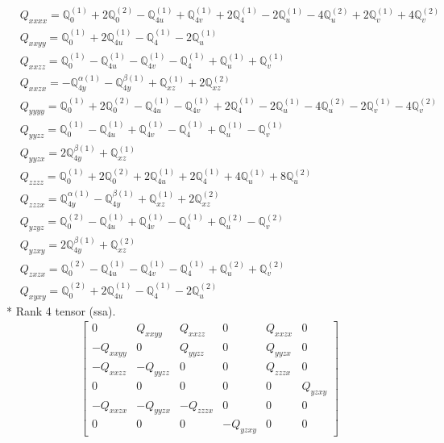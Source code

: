 \documentclass[fleqn,8pt,landscape]{jsarticle}
\begin{document}
\begin{align*}
& Q_{xxxx} = \mathbb{Q}_{0}^{(1)} + 2 \mathbb{Q}_{0}^{(2)} - \mathbb{Q}_{4u}^{(1)} + \mathbb{Q}_{4v}^{(1)} + 2 \mathbb{Q}_{4}^{(1)} - 2 \mathbb{Q}_{u}^{(1)} - 4 \mathbb{Q}_{u}^{(2)} + 2 \mathbb{Q}_{v}^{(1)} + 4 \mathbb{Q}_{v}^{(2)} \\
& Q_{xxyy} = \mathbb{Q}_{0}^{(1)} + 2 \mathbb{Q}_{4u}^{(1)} - \mathbb{Q}_{4}^{(1)} - 2 \mathbb{Q}_{u}^{(1)} \\
& Q_{xxzz} = \mathbb{Q}_{0}^{(1)} - \mathbb{Q}_{4u}^{(1)} - \mathbb{Q}_{4v}^{(1)} - \mathbb{Q}_{4}^{(1)} + \mathbb{Q}_{u}^{(1)} + \mathbb{Q}_{v}^{(1)} \\
& Q_{xxzx} = - \mathbb{Q}_{4y}^{\alpha(1)} - \mathbb{Q}_{4y}^{\beta(1)} + \mathbb{Q}_{xz}^{(1)} + 2 \mathbb{Q}_{xz}^{(2)} \\
& Q_{yyyy} = \mathbb{Q}_{0}^{(1)} + 2 \mathbb{Q}_{0}^{(2)} - \mathbb{Q}_{4u}^{(1)} - \mathbb{Q}_{4v}^{(1)} + 2 \mathbb{Q}_{4}^{(1)} - 2 \mathbb{Q}_{u}^{(1)} - 4 \mathbb{Q}_{u}^{(2)} - 2 \mathbb{Q}_{v}^{(1)} - 4 \mathbb{Q}_{v}^{(2)} \\
& Q_{yyzz} = \mathbb{Q}_{0}^{(1)} - \mathbb{Q}_{4u}^{(1)} + \mathbb{Q}_{4v}^{(1)} - \mathbb{Q}_{4}^{(1)} + \mathbb{Q}_{u}^{(1)} - \mathbb{Q}_{v}^{(1)} \\
& Q_{yyzx} = 2 \mathbb{Q}_{4y}^{\beta(1)} + \mathbb{Q}_{xz}^{(1)} \\
& Q_{zzzz} = \mathbb{Q}_{0}^{(1)} + 2 \mathbb{Q}_{0}^{(2)} + 2 \mathbb{Q}_{4u}^{(1)} + 2 \mathbb{Q}_{4}^{(1)} + 4 \mathbb{Q}_{u}^{(1)} + 8 \mathbb{Q}_{u}^{(2)} \\
& Q_{zzzx} = \mathbb{Q}_{4y}^{\alpha(1)} - \mathbb{Q}_{4y}^{\beta(1)} + \mathbb{Q}_{xz}^{(1)} + 2 \mathbb{Q}_{xz}^{(2)} \\
& Q_{yzyz} = \mathbb{Q}_{0}^{(2)} - \mathbb{Q}_{4u}^{(1)} + \mathbb{Q}_{4v}^{(1)} - \mathbb{Q}_{4}^{(1)} + \mathbb{Q}_{u}^{(2)} - \mathbb{Q}_{v}^{(2)} \\
& Q_{yzxy} = 2 \mathbb{Q}_{4y}^{\beta(1)} + \mathbb{Q}_{xz}^{(2)} \\
& Q_{zxzx} = \mathbb{Q}_{0}^{(2)} - \mathbb{Q}_{4u}^{(1)} - \mathbb{Q}_{4v}^{(1)} - \mathbb{Q}_{4}^{(1)} + \mathbb{Q}_{u}^{(2)} + \mathbb{Q}_{v}^{(2)} \\
& Q_{xyxy} = \mathbb{Q}_{0}^{(2)} + 2 \mathbb{Q}_{4u}^{(1)} - \mathbb{Q}_{4}^{(1)} - 2 \mathbb{Q}_{u}^{(2)}
\end{align*}
* Rank 4 tensor (ssa).
\begin{align*}
\begin{bmatrix} 0 & Q_{xxyy} & Q_{xxzz} & 0 & Q_{xxzx} & 0 \\ - Q_{xxyy} & 0 & Q_{yyzz} & 0 & Q_{yyzx} & 0 \\ - Q_{xxzz} & - Q_{yyzz} & 0 & 0 & Q_{zzzx} & 0 \\ 0 & 0 & 0 & 0 & 0 & Q_{yzxy} \\ - Q_{xxzx} & - Q_{yyzx} & - Q_{zzzx} & 0 & 0 & 0 \\ 0 & 0 & 0 & - Q_{yzxy} & 0 & 0 \end{bmatrix}
\end{align*}
\end{document}
